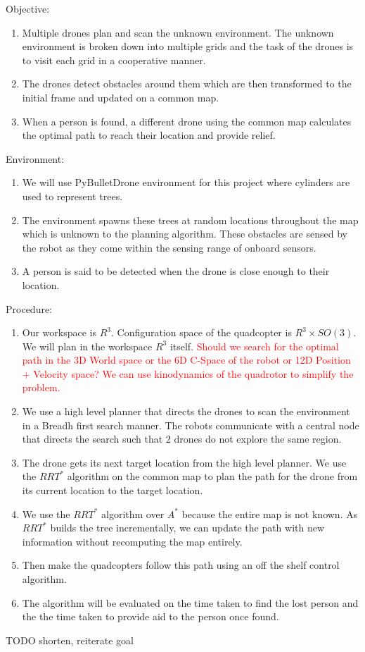 Objective:
\begin{enumerate}
    \item Multiple drones plan and scan the unknown environment. The unknown environment is broken down into multiple grids and the task of the drones is to visit each grid in a cooperative manner.
    \item The drones detect obstacles around them which are then transformed to the initial frame and updated on a common map.
    \item When a person is found, a different drone using the common map calculates the optimal path to reach their location and provide relief.
\end{enumerate}
Environment:
\begin{enumerate}
    \item We will use PyBulletDrone environment for this project where cylinders are used to represent trees.
    \item The environment spawns these trees at random locations throughout the map which is unknown to the planning algorithm. These obstacles are sensed by the robot as they come within the sensing range of onboard sensors.
    \item A person is said to be detected when the drone is close enough to their location.
\end{enumerate}
Procedure:
\begin{enumerate}
    \item Our workspace is \(R^3\). Configuration space of the quadcopter is \(R^3 \times SO(3)\). We will plan in the workspace \(R^3\) itself. \textcolor{red}{Should we search for the optimal path in the 3D World space or the 6D C-Space of the robot or 12D Position + Velocity space? We can use kinodynamics of the quadrotor to simplify the problem.}
    \item We use a high level planner that directs the drones to scan the environment in a Breadh first search manner. The robots communicate with a central node that directs the search such that 2 drones do not explore the same region.
    \item The drone gets its next target location from the high level planner. We use the \(RRT^*\) algorithm on the common map to plan the path for the drone from its current location to the target location.
    \item We use the \(RRT^*\) algorithm over \(A^*\) because the entire map is not known. As \(RRT^*\) builds the tree incrementally, we can update the path with new information without recomputing the map entirely.
    \item Then make the quadcopters follow this path using an off the shelf control algorithm.
    \item The algorithm will be evaluated on the time taken to find the lost person and the the time taken to provide aid to the person once found.
\end{enumerate}

TODO shorten, reiterate goal